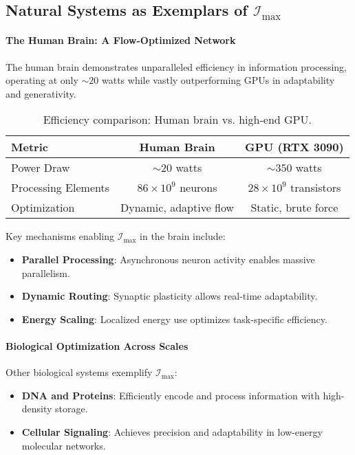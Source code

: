 \documentclass[12pt]{article}
\begin{document}
\subsection{Natural Systems as Exemplars of \(\mathcal{I}_{\text{max}}\)}

\paragraph{The Human Brain: A Flow-Optimized Network}

The human brain demonstrates unparalleled efficiency in information processing, operating at only \(\sim 20\) watts while vastly outperforming GPUs in adaptability and generativity.

\begin{table}[h!]
\centering
\begin{tabular}{|l|c|c|}
\hline
\textbf{Metric} & \textbf{Human Brain} & \textbf{GPU (RTX 3090)} \\ \hline
Power Draw & \(\sim 20\) watts & \(\sim 350\) watts \\ \hline
Processing Elements & \(86 \times 10^9\) neurons & \(28 \times 10^9\) transistors \\ \hline
Optimization & Dynamic, adaptive flow & Static, brute force \\ \hline
\end{tabular}
\caption{Efficiency comparison: Human brain vs. high-end GPU.}
\end{table}

Key mechanisms enabling \(\mathcal{I}_{\text{max}}\) in the brain include:
\begin{itemize}
    \item \textbf{Parallel Processing}: Asynchronous neuron activity enables massive parallelism.
    \item \textbf{Dynamic Routing}: Synaptic plasticity allows real-time adaptability.
    \item \textbf{Energy Scaling}: Localized energy use optimizes task-specific efficiency.
\end{itemize}

\paragraph{Biological Optimization Across Scales}
Other biological systems exemplify \(\mathcal{I}_{\text{max}}\):
\begin{itemize}
    \item \textbf{DNA and Proteins}: Efficiently encode and process information with high-density storage.
    \item \textbf{Cellular Signaling}: Achieves precision and adaptability in low-energy molecular networks.
\end{itemize}
\end{document}
